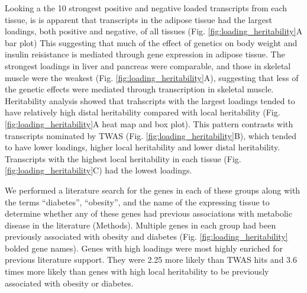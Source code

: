 \documentclass[
]{article}
\begin{document}
Looking a the 10 strongest positive and negative loaded transcripts from
each tissue, is is apparent that transcripts in the adipose tissue had
the largest loadings, both positive and negative, of all tissues (Fig.
\ref{fig:loading_heritability}A bar plot) This suggesting that much of
the effect of genetics on body weight and insulin reisistance is
mediated through gene expression in adipose tissue. The strongest
loadings in liver and pancreas were comparable, and those in skeletal
muscle were the weakest (Fig. \ref{fig:loading_heritability}A),
suggesting that less of the genetic effects were mediated through
transcription in skeletal muscle. Heritability analysis showed that
trahscripts with the largest loadings tended to have relatively high
distal heritability compared with local heritability (Fig.
\ref{fig:loading_heritability}A heat map and box plot). This pattern
contrasts with transcripts nominated by TWAS (Fig.
\ref{fig:loading_heritability}B), which tended to have lower loadings,
higher local heritability and lower distal heritability. Transcripts
with the highest local heritability in each tissue (Fig.
\ref{fig:loading_heritability}C) had the lowest loadings.

We performed a literature search for the genes in each of these groups
along with the terms ``diabetes'', ``obesity'', and the name of the
expressing tissue to determine whether any of these genes had previous
associations with metabolic disease in the literature (Methods).
Multiple genes in each group had been previously associated with obesity
and diabetes (Fig. \ref{fig:loading_heritability} bolded gene names).
Genes with high loadings were most highly enriched for previous
literature support. They were 2.25 more likely than TWAS hits and 3.6
times more likely than genes with high local heritability to be
previously associated with obesity or diabetes.
\end{document}
